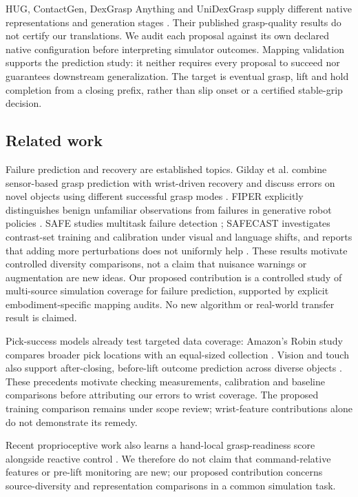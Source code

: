 \documentclass[10pt,letterpaper]{article}
\begin{document}
HUG, ContactGen, DexGrasp Anything and UniDexGrasp supply different native
representations and generation stages \cite{hug,contactgen,dga,unidex}.
Their published grasp-quality results do not certify our translations.
We audit each proposal against its own declared native configuration before
interpreting simulator outcomes. Mapping validation supports the prediction
study: it neither requires every proposal to succeed nor guarantees downstream
generalization. The target is eventual grasp, lift and hold completion from a
closing prefix, rather than slip onset or a certified stable-grip decision.

\subsection{Related work}
Failure prediction and recovery are established topics. Gilday et al. combine
sensor-based grasp prediction with wrist-driven recovery and discuss errors on
novel objects using different successful grasp modes \cite{gilday}. FIPER
explicitly distinguishes benign unfamiliar observations from failures in
generative robot policies \cite{fiper}. SAFE studies multitask failure detection
\cite{safe}; SAFECAST investigates contrast-set training and calibration under
visual and language shifts, and reports that adding more perturbations does
not uniformly help \cite{safecast}. These results motivate controlled diversity
comparisons, not a claim that nuisance warnings or augmentation are new ideas.
Our proposed contribution is a controlled study of multi-source simulation
coverage for failure prediction, supported by explicit embodiment-specific
mapping audits. No new algorithm or real-world transfer result is claimed.

Pick-success models already test targeted data coverage: Amazon's Robin study
compares broader pick locations with an equal-sized collection
\cite{robin}. Vision and touch also support after-closing, before-lift outcome
prediction across diverse objects \cite{calandra}. These precedents motivate
checking measurements, calibration and baseline comparisons before attributing
our errors to wrist coverage. The proposed training comparison remains under
scope review; wrist-feature contributions alone do not demonstrate its remedy.

Recent proprioceptive work also learns a hand-local grasp-readiness score
alongside reactive control \cite{blindreflex}. We therefore do not claim that
command-relative features or pre-lift monitoring are new; our proposed
contribution concerns source-diversity and representation comparisons in a
common simulation task.
\end{document}
